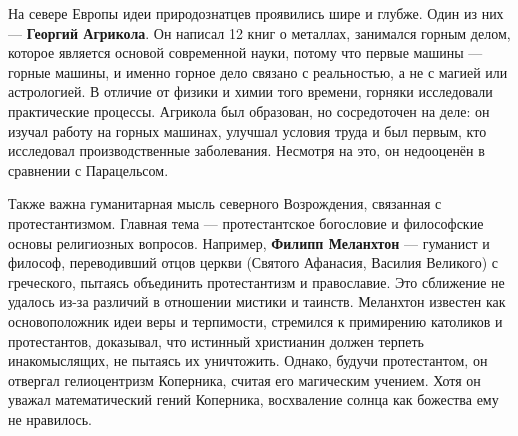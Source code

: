 На севере Европы идеи природознатцев проявились шире и глубже. Один из них --- \textbf{Георгий Агрикола}. Он написал 12 книг о металлах, занимался горным делом, которое является основой современной науки, потому что первые машины --- горные машины, и именно горное дело связано с реальностью, а не с магией или астрологией. В отличие от физики и химии того времени, горняки исследовали практические процессы.
Агрикола был образован, но сосредоточен на деле: он изучал работу на горных машинах, улучшал условия труда и был первым, кто исследовал производственные заболевания. Несмотря на это, он недооценён в сравнении с Парацельсом.

Также важна гуманитарная мысль северного Возрождения, связанная с протестантизмом. Главная тема --- протестантское богословие и философские основы религиозных вопросов. Например, \textbf{Филипп Меланхтон} --- гуманист и философ, переводивший отцов церкви (Святого Афанасия, Василия Великого) с греческого, пытаясь объединить протестантизм и православие. Это сближение не удалось из-за различий в отношении мистики и таинств.
Меланхтон известен как основоположник идеи веры и терпимости, стремился к примирению католиков и протестантов, доказывал, что истинный христианин должен терпеть инакомыслящих, не пытаясь их уничтожить.
Однако, будучи протестантом, он отвергал гелиоцентризм Коперника, считая его магическим учением. Хотя он уважал математический гений Коперника, восхваление солнца как божества ему не нравилось.


